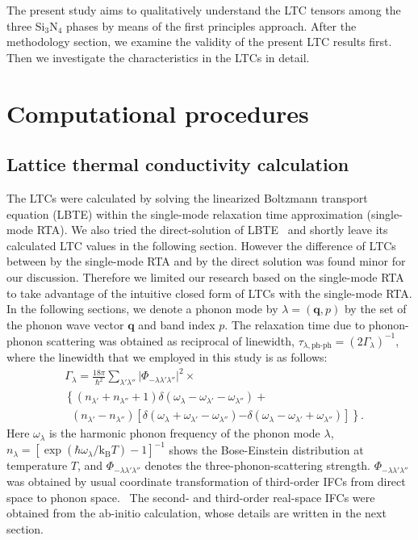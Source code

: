 \documentclass[twocolumn,amsmath,amssymb,a4paper,prb,superscriptaddress,floatfix]{revtex4-1}
\begin{document}
The present study aims to qualitatively understand the LTC tensors among the
three Si$_3$N$_4$ phases by means of the first principles approach.  After the
methodology section, we examine the validity of the present LTC results first.
Then we investigate the characteristics in the LTCs in detail.

\section{Computational procedures}
\subsection{Lattice thermal conductivity calculation}
The LTCs were calculated by solving the linearized Boltzmann transport equation
(LBTE) within the single-mode relaxation time approximation (single-mode RTA).
We also tried the direct-solution of LBTE~\cite{chaput-direct} and shortly
leave its calculated LTC values in the following section. However the
difference of LTCs between by the single-mode RTA and by the direct solution
was found minor for our discussion.  Therefore we limited our research based on
the single-mode RTA to take advantage of the intuitive closed form of LTCs with
the single-mode RTA.  In the following sections, we denote a phonon mode by
$\lambda=(\mathbf{q},p)$ by the set of the phonon wave vector $\mathbf{q}$ and
band index $p$. The relaxation time due to phonon-phonon scattering was
obtained as reciprocal of linewidth,
$\tau_{\lambda,\text{ph-ph}}=(2\Gamma_\lambda)^{-1}$, where the linewidth that
we employed in this study is as follows:
\begin{align}
 \label{eq:linewidth}
 &\Gamma_\lambda = \frac{18\pi}{\hbar^2}
  \sum_{\lambda' \lambda''}
  \bigl|\Phi_{-\lambda\lambda'\lambda''}\bigl|^2 \times \nonumber \\ 
 &\left\{ (n_{\lambda'} + n_{\lambda''}+1) 
   \delta(\omega_\lambda-\omega_{\lambda'}-\omega_{\lambda''}) \right.
   + \nonumber \\ 
 &\;\;(n_{\lambda'}-n_{\lambda''})
  \left[\delta(\omega_\lambda +\omega_{\lambda'}-\omega_{\lambda''})
 \right. 
 \left. -\left. \delta(\omega_\lambda - \omega_{\lambda'}+\omega_{\lambda''})
 \right]\right\}.
\end{align}
Here $\omega_\lambda$ is the harmonic phonon frequency of the phonon mode
$\lambda$, $n_\lambda=[\exp(\hbar\omega_\lambda/\mathrm{k_B}T)-1]^{-1}$ shows
the Bose-Einstein distribution at temperature $T$, and
$\Phi_{-\lambda\lambda'\lambda''}$ denotes the three-phonon-scattering strength.
$\Phi_{-\lambda\lambda'\lambda''}$ was obtained by usual coordinate
transformation of third-order IFCs from direct space to phonon
space.~\cite{phono3py} The second- and third-order real-space IFCs
were obtained from the ab-initio calculation, whose details are written in the
next section.
\end{document}
